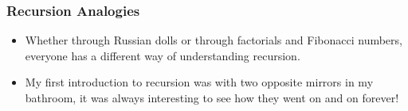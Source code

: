 \documentclass[fleqn, t]{beamer}
\begin{document}
\begin{frame}
  \frametitle{Recursion Analogies}
  \begin{itemize}[<+->]
  \item Whether through Russian dolls or through factorials and Fibonacci
    numbers, everyone has a different way of understanding recursion. 
  \item My first introduction to recursion was with two opposite mirrors in my
    bathroom, it was always interesting to see how they went on and on forever!
  \end{itemize}
  \begin{figure}
  \end{figure}
\end{frame}
\end{document}
